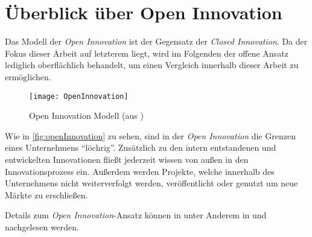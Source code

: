 \section{Überblick über Open Innovation}\label{sec:grundlagen-open}

Das Modell der \textit{Open Innovation} ist der Gegensatz der \textit{Closed Innovation}.
Da der Fokus dieser Arbeit auf letzterem liegt,
wird im Folgenden der offene Ansatz lediglich oberflächlich behandelt,
um einen Vergleich innerhalb dieser Arbeit zu ermöglichen.

\begin{figure}[ht!]
    \centering
    \texttt{[image: OpenInnovation]}
    \caption{Open Innovation Modell (aus \cite[23]{herzog2011})}
    \label{fig:openInnovation}
\end{figure}

Wie in \autoref{fig:openInnovation} zu sehen,
sind in der \textit{Open Innovation} die Grenzen eines Unternehmens \enquote{löchrig}.
Zusätzlich zu den intern entstandenen und entwickelten Innovationen
fließt jederzeit wissen von außen in den Innovationsprozess ein.
Außerdem werden Projekte, welche innerhalb des Unternehmens nicht weiterverfolgt werden,
veröffentlicht oder genutzt um neue Märkte zu erschließen.

Details zum \textit{Open Innovation}-Ansatz können in unter Anderem
in \cite[60\psqq]{chesbrough2003} und \cite[21\psqq]{herzog2011} nachgelesen werden.